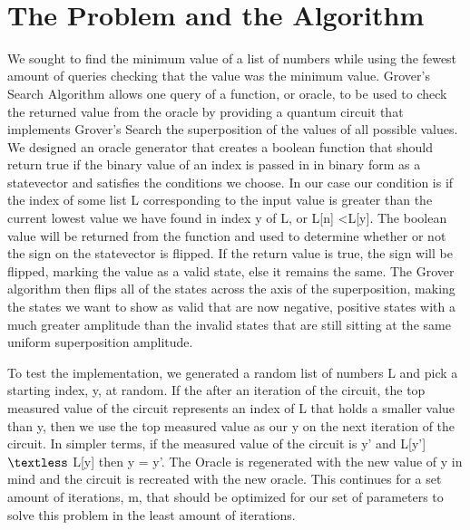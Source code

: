 \documentclass[11pt]{article}
\newcommand{\lecturenumber}{1-3}
\newcommand{\lecturedate}{8/24 - 8/28}
\begin{document}
\begin{center}
\ \\
\end{center}

\section{The Problem and the Algorithm}

We sought to find the minimum value of a list of numbers while using the fewest amount of queries checking that the value was the minimum value. Grover's Search Algorithm allows one query of a function, or oracle, to be used to check the returned value from the oracle by providing a quantum circuit that implements Grover's Search the superposition of the values of all possible values. We designed an oracle generator that creates a boolean function that should return true if the binary value of an index is passed in in binary form as a statevector and satisfies the conditions we choose. In our case our condition is if the index of some list L corresponding to the input value is greater than the current lowest value we have found in index y of L, or L[n] \textless  L[y]. The boolean value will be returned from the function and used to determine whether or not the sign on the statevector is flipped. If the return value is true, the sign will be flipped, marking the value as a valid state, else it remains the same. The Grover algorithm then flips all of the states across the axis of the superposition, making the states we want to show as valid that are now negative, positive states with a much greater amplitude than the invalid states that are still sitting at the same uniform superposition amplitude.

To test the implementation, we generated a random list of numbers L and pick a starting index, y, at random. If the after an iteration of the circuit, the top measured value of the circuit represents an index of L that holds a smaller value than y, then we use the top measured value as our y on the next iteration of the circuit. In simpler terms, if the measured value of the circuit is y' and L[y'] $\textless$ L[y] then y = y'. The Oracle is regenerated with the new value of y in mind and the circuit is recreated with the new oracle. This continues for a set amount of iterations, m, that should be optimized for our set of parameters to solve this problem in the least amount of iterations.
\end{document}
